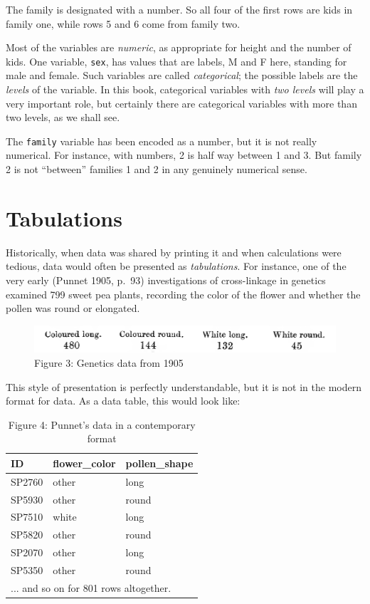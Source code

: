 \documentclass[]{book}
\begin{document}
The family is designated with a number. So all four of the first rows are kids in family one, while rows 5 and 6 come from family two.

Most of the variables are \emph{numeric}, as appropriate for height and the number of kids. One variable, \texttt{sex}, has values that are labels, M and F here, standing for male and female. Such variables are called \emph{categorical}; the possible labels are the \emph{levels} of the variable. In this book, categorical variables with \emph{two levels} will play a very important role, but certainly there are categorical variables with more than two levels, as we shall see.

The \texttt{family} variable has been encoded as a number, but it is not really numerical. For instance, with numbers, 2 is half way between 1 and 3. But family 2 is not ``between'' families 1 and 2 in any genuinely numerical sense.

\hypertarget{tabulations}{%
\section{Tabulations}\label{tabulations}}

Historically, when data was shared by printing it and when calculations were tedious, data would often be presented as \emph{tabulations}. For instance, one of the very early (Punnet 1905, p.~93) investigations of cross-linkage in genetics examined 799 sweet pea plants, recording the color of the flower and whether the pollen was round or elongated.

\begin{figure}\includegraphics[width=0.8\linewidth]{images/Punnet-page-93} \caption{Figure 3: Genetics data from 1905}\label{fig:punnet-93}
\end{figure}

This style of presentation is perfectly understandable, but it is not in the modern format for data. As a data table, this would look like:

\begin{table}[t]

\caption{\label{tab:punnet-raw}Figure 4: Punnet's data in a contemporary format}
\centering
\begin{tabular}{l|l|l}
\hline
ID & flower\_color & pollen\_shape\\
\hline
SP2760 & other & long\\
\hline
SP5930 & other & round\\
\hline
SP7510 & white & long\\
\hline
SP5820 & other & round\\
\hline
SP2070 & other & long\\
\hline
SP5350 & other & round\\
\hline
\multicolumn{3}{l}{... and so on for 801 rows altogether.}\\
\end{tabular}
\end{table}
\end{document}
